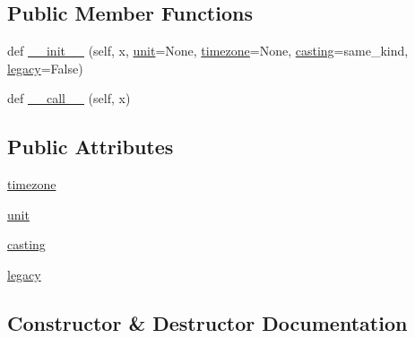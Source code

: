 \subsection*{Public Member Functions}
\begin{DoxyCompactItemize}
\item 
def \hyperlink{classnumpy_1_1core_1_1arrayprint_1_1DatetimeFormat_aa9ec722b253d0940588314f4852aca75}{\+\_\+\+\_\+init\+\_\+\+\_\+} (self, x, \hyperlink{classnumpy_1_1core_1_1arrayprint_1_1DatetimeFormat_a821a13bc43e2038848afd34c28864c82}{unit}=None, \hyperlink{classnumpy_1_1core_1_1arrayprint_1_1DatetimeFormat_a5559e102f8b5a9824f8b2d7e4d05e973}{timezone}=None, \hyperlink{classnumpy_1_1core_1_1arrayprint_1_1DatetimeFormat_a3b75202c9fc9cf6dacdd5e2433b16c75}{casting}=\textquotesingle{}same\+\_\+kind\textquotesingle{}, \hyperlink{classnumpy_1_1core_1_1arrayprint_1_1DatetimeFormat_a3ad6c99471907c2d4472d362b7e25348}{legacy}=False)
\item 
def \hyperlink{classnumpy_1_1core_1_1arrayprint_1_1DatetimeFormat_a35329ae78a0ffd2b6458cb656371a8aa}{\+\_\+\+\_\+call\+\_\+\+\_\+} (self, x)
\end{DoxyCompactItemize}
\subsection*{Public Attributes}
\begin{DoxyCompactItemize}
\item 
\hyperlink{classnumpy_1_1core_1_1arrayprint_1_1DatetimeFormat_a5559e102f8b5a9824f8b2d7e4d05e973}{timezone}
\item 
\hyperlink{classnumpy_1_1core_1_1arrayprint_1_1DatetimeFormat_a821a13bc43e2038848afd34c28864c82}{unit}
\item 
\hyperlink{classnumpy_1_1core_1_1arrayprint_1_1DatetimeFormat_a3b75202c9fc9cf6dacdd5e2433b16c75}{casting}
\item 
\hyperlink{classnumpy_1_1core_1_1arrayprint_1_1DatetimeFormat_a3ad6c99471907c2d4472d362b7e25348}{legacy}
\end{DoxyCompactItemize}


\subsection{Constructor \& Destructor Documentation}
\mbox{\label{classnumpy_1_1core_1_1arrayprint_1_1DatetimeFormat_aa9ec722b253d0940588314f4852aca75}} 
